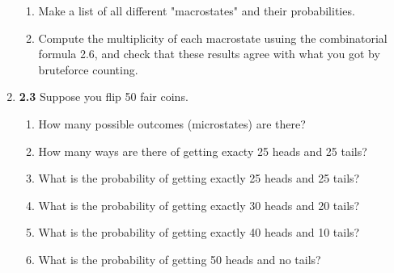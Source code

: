 \documentclass[fleqn]{article}
\begin{document}
\begin{enumerate}
\begin{enumerate}
      \item Make a list of all different "macrostates" and their probabilities.


      \item Compute the multiplicity of each macrostate usuing the combinatorial formula 2.6, and check 
      that these results agree with what you got by bruteforce counting.

      
    \end{enumerate}


    \item \textbf{2.3} Suppose you flip 50 fair coins.
    \begin{enumerate}
      \item How many possible outcomes (microstates) are there?


      \item How many ways are there of getting exacty 25 heads and 25 tails?


      \item What is the probability of getting exactly 25 heads and 25 tails?


      \item What is the probability of getting exactly 30 heads and 20 tails?
      

      \item What is the probability of getting exactly 40 heads and 10 tails?


      \item What is the probability of getting 50 heads and no tails?


\end{enumerate}
\end{enumerate}
\end{document}
